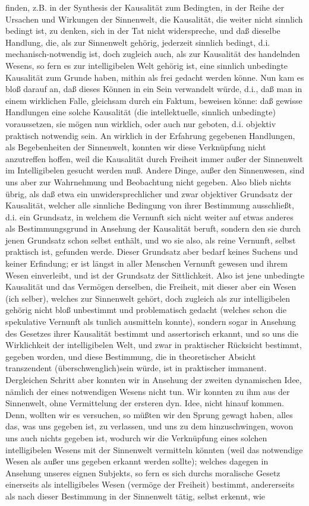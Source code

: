 \documentclass[a4paper,12pt,twoside]{book}
\begin{document}
finden, z.B. in der Synthesis der Kausalität zum Bedingten, in der Reihe der Ursachen und Wirkungen der Sinnenwelt, die Kausalität, die weiter nicht sinnlich bedingt ist, zu denken, sich in der Tat nicht widerspreche, und daß dieselbe Handlung, die, als zur Sinnenwelt gehörig, jederzeit sinnlich bedingt, d.i. mechanisch-notwendig ist, doch zugleich auch, als zur Kausalität des handelnden Wesens, so fern es zur intelligibelen Welt gehörig ist, eine sinnlich unbedingte Kausalität zum Grunde haben, mithin als frei gedacht werden könne. Nun kam es bloß darauf an, daß dieses Können in ein Sein verwandelt würde, d.i., daß man in einem wirklichen Falle, gleichsam durch ein Faktum, beweisen könne: daß gewisse Handlungen eine solche Kausalität (die intellektuelle, sinnlich unbedingte) voraussetzen, sie mögen nun wirklich, oder auch nur geboten, d.i. objektiv praktisch notwendig sein. An wirklich in der Erfahrung  gegebenen Handlungen, als Begebenheiten der Sinnenwelt, konnten wir diese Verknüpfung nicht anzutreffen hoffen, weil die Kausalität durch Freiheit immer außer der Sinnenwelt im Intelligibelen gesucht werden muß. Andere Dinge, außer den Sinnenwesen, sind uns aber zur Wahrnehmung und Beobachtung nicht gegeben. Also blieb nichts übrig, als daß etwa ein unwidersprechlicher und zwar objektiver Grundsatz der Kausalität, welcher alle sinnliche Bedingung von ihrer Bestimmung ausschließt, d.i. ein Grundsatz, in welchem die Vernunft sich nicht weiter auf etwas anderes als Bestimmungsgrund in Ansehung der Kausalität beruft, sondern den sie durch jenen Grundsatz schon selbst enthält, und wo sie also, als reine Vernunft, selbst praktisch ist, gefunden werde. Dieser Grundsatz aber bedarf keines Suchens und keiner Erfindung; er ist längst in aller Menschen Vernunft gewesen und ihrem Wesen einverleibt, und ist der Grundsatz der Sittlichkeit. Also ist jene unbedingte Kausalität und das Vermögen derselben, die Freiheit, mit dieser aber ein Wesen (ich selber), welches zur Sinnenwelt gehört, doch zugleich als zur intelligibelen gehörig nicht bloß unbestimmt und problematisch gedacht (welches schon die spekulative Vernunft als tunlich ausmitteln konnte), sondern sogar in Ansehung des Gesetzes ihrer Kausalität bestimmt und assertorisch erkannt, und so uns die Wirklichkeit der intelligibelen Welt, und zwar in praktischer Rücksicht bestimmt, gegeben worden, und diese Bestimmung, die in theoretischer Absicht transzendent (überschwenglich)sein würde, ist in praktischer immanent. Dergleichen Schritt aber konnten wir in Ansehung der zweiten dynamischen Idee, nämlich der eines notwendigen Wesens nicht tun. Wir konnten zu ihm aus der Sinnenwelt, ohne Vermittelung der ersteren dyn. Idee, nicht hinauf kommen. Denn, wollten wir es versuchen, so müßten wir den Sprung gewagt haben, alles das, was uns gegeben ist, zu verlassen, und uns zu dem hinzuschwingen, wovon uns auch nichts gegeben ist, wodurch wir die Verknüpfung eines solchen intelligibelen Wesens mit der Sinnenwelt vermitteln könnten (weil das notwendige Wesen als außer uns gegeben  erkannt werden sollte); welches dagegen in Ansehung unseres eignen Subjekts, so fern es sich durchs moralische Gesetz einerseits als intelligibeles Wesen (vermöge der Freiheit) bestimmt, andererseits als nach dieser Bestimmung in der Sinnenwelt tätig, selbst erkennt, wie 
\end{document}
